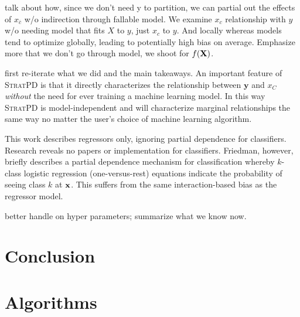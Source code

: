 \documentclass[12pt]{article}
\newcommand{\spd}{\fontfamily{cmr}\textsc{\small StratPD}}
\newcommand{\xnc}{$x_{\overline{c}}$}
\begin{document}
talk about how, since we don't need y to partition, we can partial out the effects of \xnc{} w/o indirection through fallable model.  We examine $x_c$ relationship with $y$ w/o needing model that fits $X$ to $y$, just $x_c$ to $y$. And locally whereas models tend to optimize globally, leading to potentially high bias on average. Emphasize more that we don't go through model, we shoot for $f(\bf X)$.

{\color{red} first re-iterate what we did and the main takeaways}. An important feature of \spd{} is that it directly characterizes the relationship between $\mathbf{y}$ and $x_C$ \emph{without} the need for ever training a machine learning model. In this way \spd{} is {model-independent} and will characterize marginal relationships the same way no matter the user's choice of machine learning algorithm. 

This work describes regressors only, ignoring partial dependence for classifiers.  Research reveals no papers or implementation for classifiers. Friedman, however, briefly describes a partial dependence mechanism for classification whereby $k$-class logistic regression (one-versus-rest) equations indicate the probability of seeing class $k$ at $\bf{x}$.  This suffers from the same interaction-based bias as the regressor model.

better handle on hyper parameters; summarize what we know now.

\section{Conclusion}
\label{sec:conc}

\section{Algorithms}
\end{document}
